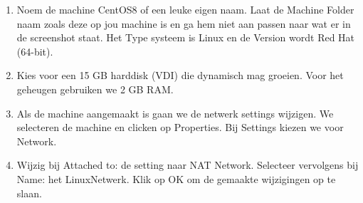 \begin{enumerate}
	\item 
		\begin{minipage}[t]{\linewidth}
		\raggedright
		Noem de machine CentOS8 of een leuke eigen naam. Laat de Machine Folder naam zoals deze op jou machine is en ga hem niet aan passen naar wat er in de screenshot staat. Het Type systeem is Linux en de Version wordt Red Hat (64-bit).
		\end{minipage}
	\item Kies voor een 15 GB harddisk (VDI) die dynamisch mag groeien. Voor het geheugen gebruiken we 2 GB RAM.
	\item Als de machine aangemaakt is gaan we de netwerk settings wijzigen. We selecteren de machine en clicken op Properties. Bij Settings kiezen we voor Network.
	\item
		\begin{minipage}[t]{\linewidth}
		\raggedright
		Wijzig bij Attached to: de setting naar NAT Network. Selecteer vervolgens bij Name: het LinuxNetwerk. Klik op OK om de gemaakte wijzigingen op te slaan.
		\end{minipage}
\end{enumerate}
